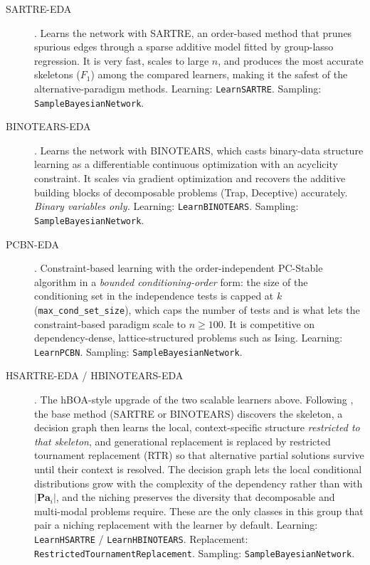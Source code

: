 \documentclass[a4paper,11pt]{article}
\begin{document}
\begin{description}
  \item[SARTRE-EDA] \citep{Kanamori_et_al:2026}.
    Learns the network with SARTRE, an order-based method that prunes spurious
    edges through a sparse additive model fitted by group-lasso regression.  It
    is very fast, scales to large $n$, and produces the most accurate skeletons
    ($F_1$) among the compared learners, making it the safest of the
    alternative-paradigm methods.
    Learning: \texttt{LearnSARTRE}. Sampling: \texttt{SampleBayesianNetwork}.

  \item[BINOTEARS-EDA] \citep{Deng_and_Aragam:2025}.
    Learns the network with BINOTEARS, which casts binary-data structure
    learning as a differentiable continuous optimization with an acyclicity
    constraint.  It scales via gradient optimization and recovers the additive
    building blocks of decomposable problems (Trap, Deceptive) accurately.
    \emph{Binary variables only.}
    Learning: \texttt{LearnBINOTEARS}. Sampling: \texttt{SampleBayesianNetwork}.

  \item[PCBN-EDA] \citep{Spirtes_et_al:1993,Colombo_and_Maathuis:2014}.
    Constraint-based learning with the order-independent PC-Stable algorithm in
    a \emph{bounded conditioning-order} form: the size of the conditioning set
    in the independence tests is capped at $k$ (\texttt{max\_cond\_set\_size}),
    which caps the number of tests and is what lets the constraint-based
    paradigm scale to $n \ge 100$.  It is competitive on dependency-dense,
    lattice-structured problems such as Ising.
    Learning: \texttt{LearnPCBN}. Sampling: \texttt{SampleBayesianNetwork}.

  \item[HSARTRE-EDA / HBINOTEARS-EDA].
    The hBOA-style upgrade of the two scalable learners above.  Following
    \citet{Pelikan:2005}, the base method (SARTRE or BINOTEARS) discovers the
    skeleton, a decision graph then learns the local, context-specific structure
    \emph{restricted to that skeleton}, and generational replacement is replaced
    by restricted tournament replacement (RTR) so that alternative partial
    solutions survive until their context is resolved.  The decision graph lets
    the local conditional distributions grow with the complexity of the
    dependency rather than with $|\mathbf{Pa}_i|$, and the niching preserves the
    diversity that decomposable and multi-modal problems require.  These are the
    only classes in this group that pair a niching replacement with the learner
    by default.
    Learning: \texttt{LearnHSARTRE} / \texttt{LearnHBINOTEARS}.
    Replacement: \texttt{RestrictedTournamentReplacement}.
    Sampling: \texttt{SampleBayesianNetwork}.
\end{description}
\end{document}
